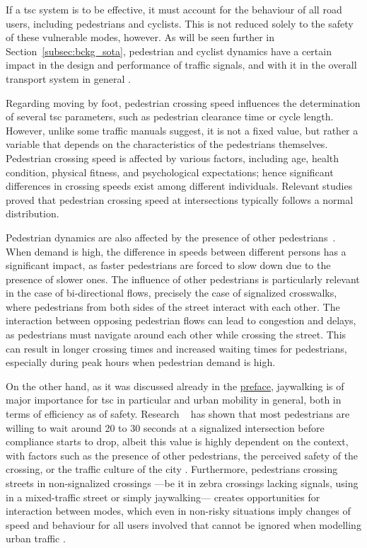\medskip

\noindent If a \gls{tsc} system is to be effective, it must account for the behaviour of all road users, including pedestrians and cyclists. This is not reduced solely to the safety of these vulnerable modes, however. As will be seen further in Section~\ref{subsec:bckg_sota}, pedestrian and cyclist dynamics have a certain impact in the design and performance of traffic signals, and with it in the overall transport system in general \cite{Noland1996}.

\medskip

\noindent Regarding moving by foot, pedestrian crossing speed influences the determination of several \gls{tsc} parameters, such as pedestrian clearance time or cycle length. However, unlike some traffic manuals suggest, it is not a fixed value, but rather a variable that depends on the characteristics of the pedestrians themselves. Pedestrian crossing speed is affected by various factors, including age, health condition, physical fitness, and psychological expectations; hence significant differences in crossing speeds exist among different individuals. Relevant studies~\cite{Huang2010, Chandra2013} proved that pedestrian crossing speed at intersections typically follows a normal distribution.

Pedestrian dynamics are also affected by the presence of other pedestrians~\cite{Alhajyaseen2009}. When demand is high, the difference in speeds between different persons has a significant impact, as faster pedestrians are forced to slow down due to the presence of slower ones. The influence of other pedestrians is particularly relevant in the case of bi-directional flows, precisely the case of signalized crosswalks, where pedestrians from both sides of the street interact with each other. The interaction between opposing pedestrian flows can lead to congestion and delays, as pedestrians must navigate around each other while crossing the street. This can result in longer crossing times and increased waiting times for pedestrians, especially during peak hours when pedestrian demand is high.

On the other hand, as it was discussed already in the \hyperref[sec:preface]{preface}, jaywalking is of major importance for \gls{tsc} in particular and urban mobility in general, both in terms of efficiency as of safety. Research ~\cite{Crompton1979, Gaarder1989, Martin2006} has shown that most pedestrians are willing to wait around 20 to 30 seconds at a signalized intersection before compliance starts to drop, albeit this value is highly dependent on the context, with factors such as the presence of other pedestrians, the perceived safety of the crossing, or the traffic culture of the city \cite{Retzko1974}. Furthermore, pedestrians crossing streets in non-signalized crossings —be it in zebra crossings lacking signals, using in a mixed-traffic street or simply jaywalking— creates opportunities for interaction between modes, which even in non-risky situations imply changes of speed and behaviour for all users involved that cannot be ignored when modelling urban traffic \cite{Marisamynathan2018}.

